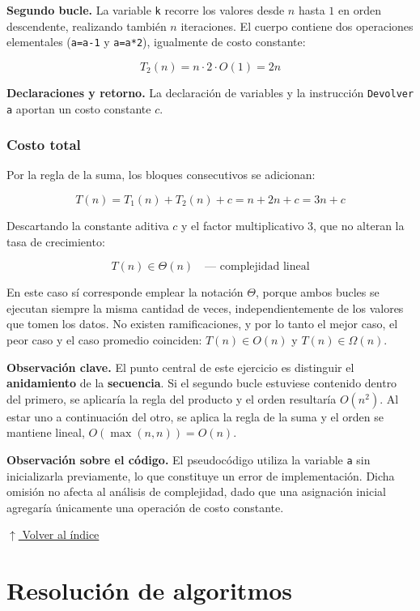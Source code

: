 \documentclass[12pt]{article}
\newcommand{\codigo}[1]{\texttt{\small #1}}
\newcommand{\volverindice}{%
    \vspace{1em}%
    \begin{flushright}%
        \hyperlink{indice}{\small $\uparrow$ Volver al índice}%
    \end{flushright}%
}
\begin{document}
\textbf{Segundo bucle.} La variable \codigo{k} recorre los valores desde $n$ hasta $1$ en orden descendente, realizando también $n$ iteraciones. El cuerpo contiene dos operaciones elementales (\codigo{a=a-1} y \codigo{a=a*2}), igualmente de costo constante:

\[
T_2(n) = n \cdot 2 \cdot O(1) = 2n
\]

\textbf{Declaraciones y retorno.} La declaración de variables y la instrucción \codigo{Devolver a} aportan un costo constante $c$.

\subsubsection*{Costo total}

Por la regla de la suma, los bloques consecutivos se adicionan:

\[
T(n) = T_1(n) + T_2(n) + c = n + 2n + c = 3n + c
\]

Descartando la constante aditiva $c$ y el factor multiplicativo $3$, que no alteran la tasa de crecimiento:

\[
\boxed{T(n) \in \Theta(n) \quad \text{— complejidad lineal}}
\]

En este caso sí corresponde emplear la notación $\Theta$, porque ambos bucles se ejecutan siempre la misma cantidad de veces, independientemente de los valores que tomen los datos. No existen ramificaciones, y por lo tanto el mejor caso, el peor caso y el caso promedio coinciden: $T(n) \in O(n)$ y $T(n) \in \Omega(n)$.

\textbf{Observación clave.} El punto central de este ejercicio es distinguir el \textbf{anidamiento} de la \textbf{secuencia}. Si el segundo bucle estuviese contenido dentro del primero, se aplicaría la regla del producto y el orden resultaría $O(n^2)$. Al estar uno a continuación del otro, se aplica la regla de la suma y el orden se mantiene lineal, $O(\max(n, n)) = O(n)$.

\textbf{Observación sobre el código.} El pseudocódigo utiliza la variable \codigo{a} sin inicializarla previamente, lo que constituye un error de implementación. Dicha omisión no afecta al análisis de complejidad, dado que una asignación inicial agregaría únicamente una operación de costo constante.

\volverindice
\newpage


\section{Resolución de algoritmos}
\end{document}
